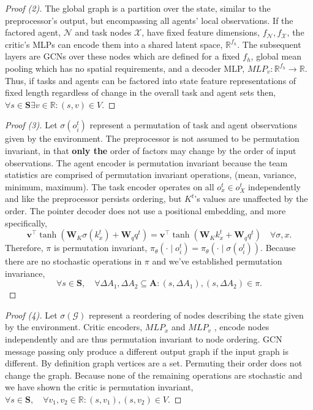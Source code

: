 \begin{proof}[Proof (2)]
    \label{proof:definedq}
    The global graph is a partition over the state, similar to the preprocessor's output, but encompassing all agents' local observations. If the factored agent, $\mathcal{N}$  and task nodes $\mathcal{X}$, have fixed feature dimensions, $f_\mathcal{N}, f_{\mathcal{X}}$, the critic's MLPs can encode them into a shared latent space, $\mathbb{R}^{f_h}$.  The subsequent layers are GCNs over these nodes which are defined for a fixed $f_h$, global mean pooling which has no spatial requirements, and a decoder MLP, $MLP_v: \mathbb{R}^{f_h}\to \mathbb{R}$. Thus, if tasks and agents can be factored into state feature representations of fixed length regardless of change in the overall task and agent sets then,  $\forall s \in \mathbf{S} \exists v \in \mathbb{R}: (s,v) \in V$.
\end{proof}

\begin{proof}[Proof (3)]
    \label{proof:mappingpi}
        Let $\sigma(o_i^t)$ represent a permutation of task and agent observations given by the environment. The preprocessor is not assumed to be permutation invariant, in that \textbf{only the} order of factors may change by the order of input observations. The agent encoder is permutation invariant because the team statistics are comprised of permutation invariant operations, (mean, variance, minimum, maximum). The task encoder operates on all $o_x^t \in o_X^t$ independently and like the preprocessor persists ordering, but $K^t$'s values are unaffected by the order. The pointer decoder does not use a positional embedding, and more specifically,
$$
\mathbf{v}^\top\!\tanh(\mathbf{W}_K \sigma(k_x^t) + \mathbf{W}_q q^t) = \mathbf{v}^\top\!\tanh(\mathbf{W}_K k_x^t + \mathbf{W}_q q^t) \quad \forall \sigma, x.
    $$
    Therefore,  $\pi$ is permutation invariant, $\pi_\theta(\cdot \mid o_i^t) = \pi_\theta(\cdot \mid \sigma(o_i^t))$.  Because there are no stochastic operations in $\pi$ and we've established permutation invariance,  
$$
    \forall s \in \mathbf{S}, \quad \forall \Delta A_1, \Delta A_2 \subseteq \mathbf{A}: (s,\Delta A_1), (s,\Delta A_2) \in \pi.
$$
\end{proof}

\begin{proof}[Proof (4)]
    \label{proof:mappingq}
    Let $\sigma(\mathcal{G})$ represent a reordering of nodes describing the state given by the environment. Critic encoders, $MLP_x$ and $MLP_v$ , encode nodes independently and are thus permutation invariant to node ordering. GCN message passing only produce a different output graph if the input graph is different. By definition graph vertices are a set. Permuting their order does not change the graph. Because none of the remaining operations are stochastic and we have shown the critic is permutation invariant,  $\forall s \in \mathbf{S}, \quad \forall v_1,  v_2 \in \mathbb{R}: (s,v_1), (s,v_2) \in V.$
\end{proof}
 

